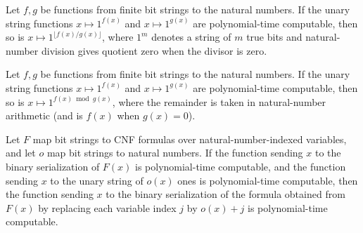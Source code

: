 \begin{theorem}
\label{Complexity.FormulaKit.polyTimeComputable_unary_div}
\leanok
{}
Let $f,g$ be functions from finite bit strings to the natural numbers. If the unary
string functions $x\mapsto 1^{f(x)}$ and $x\mapsto 1^{g(x)}$ are polynomial-time
computable, then so is $x\mapsto 1^{\lfloor f(x)/g(x)\rfloor}$, where $1^m$ denotes a
string of $m$ true bits and natural-number division gives quotient zero when the divisor
is zero.
\end{theorem}

\begin{theorem}
\label{Complexity.FormulaKit.polyTimeComputable_unary_mod}
\leanok
{}
Let $f,g$ be functions from finite bit strings to the natural numbers. If the unary
string functions $x\mapsto 1^{f(x)}$ and $x\mapsto 1^{g(x)}$ are polynomial-time
computable, then so is $x\mapsto 1^{f(x)\bmod g(x)}$, where the remainder is taken in
natural-number arithmetic (and is $f(x)$ when $g(x)=0$).
\end{theorem}

\begin{theorem}
\label{Complexity.FormulaKit.polyTimeComputable_serialize_relabel_add}
\leanok
{}
Let $F$ map bit strings to CNF formulas over natural-number-indexed variables, and let
$o$ map bit strings to natural numbers. If the function sending $x$ to the binary
serialization of $F(x)$ is polynomial-time computable, and the function sending $x$ to
the unary string of $o(x)$ ones is polynomial-time computable, then the function sending
$x$ to the binary serialization of the formula obtained from $F(x)$ by replacing each
variable index $j$ by $o(x)+j$ is polynomial-time computable.
\end{theorem}
